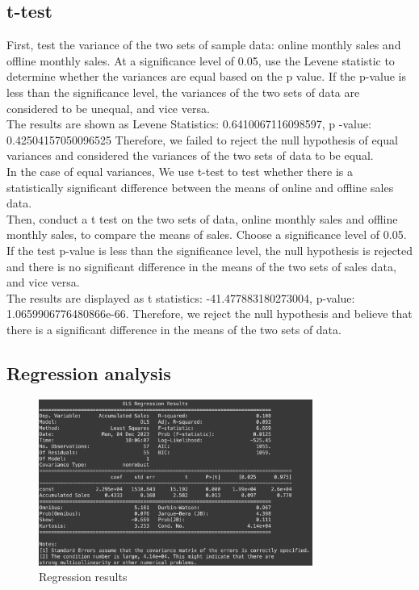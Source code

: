 \documentclass{article}
\begin{document}
\subsection{t-test}
First, test the variance of the two sets of sample data: online monthly sales and offline monthly sales. At a significance level of 0.05, use the Levene statistic to determine whether the variances are equal based on the p value. If the p-value is less than the significance level, the variances of the two sets of data are considered to be unequal, and vice versa.
\\The results are shown as Levene Statistics: 0.6410067116098597, p -value: 0.42504157050096525
Therefore, we failed to reject the null hypothesis of equal variances and considered the variances of the two sets of data to be equal.
\\In the case of equal variances, We use t-test to test whether there is a statistically significant difference between the means of online and offline sales data.
\\Then, conduct a t test on the two sets of data, online monthly sales and offline monthly sales, to compare the means of sales. Choose a significance level of 0.05. If the test p-value is less than the significance level, the null hypothesis is rejected and there is no significant difference in the means of the two sets of sales data, and vice versa.
\\The results are displayed as t statistics: -41.477883180273004, p-value: 1.0659906776480866e-66. Therefore, we reject the null hypothesis and believe that there is a significant difference in the means of the two sets of data.

\subsection{Regression analysis}

\begin{figure}[h]
  \centering
  \includegraphics[width=0.8\textwidth]{Regression results.png}
  \caption{Regression results}
  \label{fig:yourlabel}
\end{figure}
\end{document}
